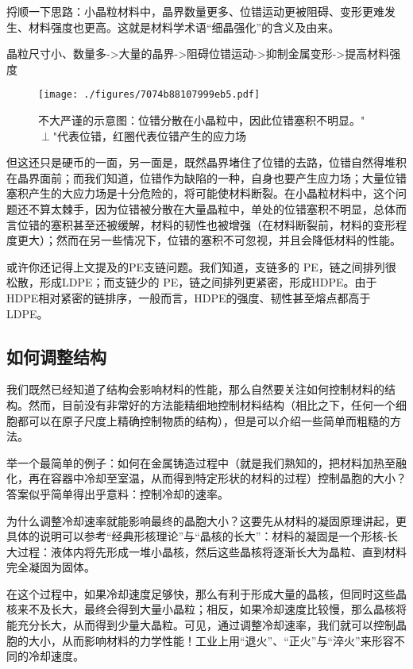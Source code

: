 捋顺一下思路：小晶粒材料中，晶界数量更多、位错运动更被阻碍、变形更难发生、材料强度也更高。这就是材料学术语“细晶强化”的含义及由来。

晶粒尺寸小、数量多->大量的晶界->阻碍位错运动->抑制金属变形->提高材料强度

\begin{figure}[ht]
\centering
\texttt{[image: ./figures/7074b88107999eb5.pdf]}
\caption{不大严谨的示意图：位错分散在小晶粒中，因此位错塞积不明显。"$\perp$"代表位错，红圈代表位错产生的应力场} \label{fig_MSEINT_5}
\end{figure}

但这还只是硬币的一面，另一面是，既然晶界堵住了位错的去路，位错自然得堆积在晶界面前；而我们知道，位错作为缺陷的一种，自身也要产生应力场；大量位错塞积产生的大应力场是十分危险的，将可能使材料断裂。在小晶粒材料中，这个问题还不算太棘手，因为位错被分散在大量晶粒中，单处的位错塞积不明显，总体而言位错的塞积甚至还被缓解，材料的韧性也被增强（在材料断裂前，材料的变形程度更大）；然而在另一些情况下，位错的塞积不可忽视，并且会降低材料的性能。


或许你还记得上文提及的PE支链问题。我们知道，支链多的 PE，链之间排列很松散，形成LDPE；而支链少的 PE，链之间排列更紧密，形成HDPE。由于HDPE相对紧密的链排序，一般而言，HDPE的强度、韧性甚至熔点都高于LDPE。

\subsection{如何调整结构}

我们既然已经知道了结构会影响材料的性能，那么自然要关注如何控制材料的结构。然而，目前没有非常好的方法能精细地控制材料结构（相比之下，任何一个细胞都可以在原子尺度上精确控制物质的结构），但是可以介绍一些简单而粗糙的方法。

举一个最简单的例子：如何在金属铸造过程中（就是我们熟知的，把材料加热至融化，再在容器中冷却至室温，从而得到特定形状的材料的过程）控制晶胞的大小？答案似乎简单得出乎意料：控制冷却的速率。

为什么调整冷却速率就能影响最终的晶胞大小？这要先从材料的凝固原理讲起，更具体的说明可以参考“经典形核理论”与“晶核的长大”：材料的凝固是一个形核-长大过程：液体内将先形成一堆小晶核，然后这些晶核将逐渐长大为晶粒、直到材料完全凝固为固体。

在这个过程中，如果冷却速度足够快，那么有利于形成大量的晶核，但同时这些晶核来不及长大，最终会得到大量小晶粒；相反，如果冷却速度比较慢，那么晶核将能充分长大，从而得到少量大晶粒。可见，通过调整冷却速率，我们就可以控制晶胞的大小，从而影响材料的力学性能！工业上用“退火”、“正火”与“淬火”来形容不同的冷却速度。

